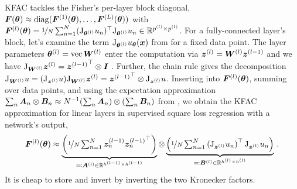 KFAC tackles the Fisher's per-layer block diagonal, ${\bm{F}}({\bm{\theta}}) \approx \operatorname{diag}({\bm{F}}^{(1)}({\bm{\theta}}), \dots, {\bm{F}}^{(L)}({\bm{\theta}}))$ with ${\bm{F}}^{(l)}({\bm{\theta}}) = \nicefrac{1}{N} \sum_{n=1}^N (\mathrm{J}_{{\bm{\theta}}^{(l)}} u_n)^{\top} \mathrm{J}_{{\bm{\theta}}^{(l)}} u_n \in {\mathbb{R}}^{ p^{(l)} \times p^{(l)} }$.
For a fully-connected layer's block, let's examine the term $\mathrm{J}_{{\bm{\theta}}^{(l)}} u_{{\bm{\theta}}}({\bm{x}})$ from  for a fixed data point.
The layer parameters ${\bm{\theta}}^{(l)} = \operatorname{vec} {\bm{W}}^{(l)}$ enter the computation via ${\bm{z}}^{(l)} = {\bm{W}}^{(l)}{\bm{z}}^{(l-1)}$ and we have $\mathrm{J}_{{\bm{W}}^{(l)}} {\bm{z}}^{(l)} = {{\bm{z}}^{(l-1)}}^\top \otimes {\bm{I}}$ \citep[e.g.][]{dangel2020modular}.
Further, the chain rule gives the decomposition $\mathrm{J}_{{\bm{W}}^{(l)}} u = (\mathrm{J}_{{\bm{z}}^{(l)}} u) \mathrm{J}_{{\bm{W}}^{(l)}} {\bm{z}}^{(l)} = {{\bm{z}}^{(l-1)}}^\top\otimes \mathrm{J}_{{\bm{z}}^{(l)}} u$.
Inserting into ${\bm{F}}^{(l)}({\bm{\theta}})$, summing over data points, and using the expectation approximation $\sum_n {\bm{A}}_n \otimes {\bm{B}}_n \approx N^{-1}(\sum_n {\bm{A}}_n) \otimes (\sum_n {\bm{B}}_n)$ from \citet{martens2015optimizing}, we obtain the KFAC approximation for linear layers in supervised square loss regression with a network's output,
\begin{equation}\label{eq:kfac-linear}
  {\bm{F}}^{(l)}({\bm{\theta}})
  \approx
  \underbrace{
    \left(
      \nicefrac{1}{N}
      \textstyle
      \sum_{n=1}^N {\bm{z}}^{(l-1)}_n {{\bm{z}}^{(l-1)}_n}^\top
    \right)
  }_{\eqqcolon {\bm{A}}^{(l)} \in {\mathbb{R}}^{h^{(l-1)} \times h^{(l-1)}}}
  \otimes
  \underbrace{
    \left(
      \nicefrac{1}{N}
      \textstyle
      \sum_{n=1}^N
      \left(\mathrm{J}_{{\bm{z}}^{(l)}}  u_n \right)^\top
      \mathrm{J}_{{\bm{z}}^{(l)}}  u_n
    \right)
  }_{\eqqcolon {\bm{B}}^{(l)} \in {\mathbb{R}}^{h^{(l)} \times h^{(l)} }}\,.
\end{equation}
It is cheap to store and invert by inverting the two Kronecker factors.

